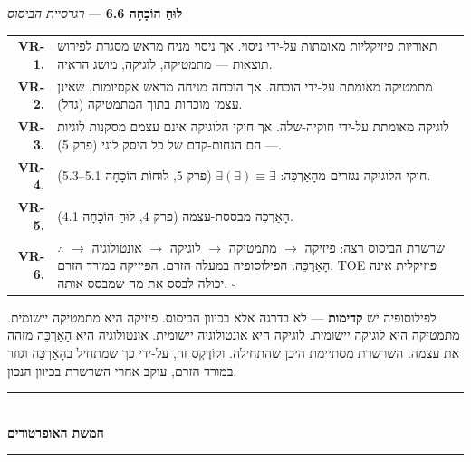 \documentclass[10pt, openany, oneside]{book}
\renewcommand{\normalsize}{\fontsize{10}{13}\selectfont}
\renewcommand{\footnotesize}{\fontsize{8.5}{11}\selectfont}
\begin{document}
\vspace{0.5em}

\textbf{לוּחַ הוֹכָחָה 6.6} --- \textit{רגרסיית הביסוס}

\vspace{0.5em}

{\footnotesize
\noindent\begin{tabular}{r p{}}
\textbf{VR-1.} & תאוריות פיזיקליות מאומתות על-ידי ניסוי. אך ניסוי מניח מראש מסגרת לפירוש תוצאות — מתמטיקה, לוגיקה, מושג הראיה. \\[0.3em]
\textbf{VR-2.} & מתמטיקה מאומתת על-ידי הוכחה. אך הוכחה מניחה מראש אקסיומות, שאינן עצמן מוכחות בתוך המתמטיקה (גדל). \\[0.3em]
\textbf{VR-3.} & לוגיקה מאומתת על-ידי חוקיה-שלה. אך חוקי הלוגיקה אינם עצמם מסקנות לוגיות — הם הנחות-קדם של כל היסק לוגי (פרק 5). \\[0.3em]
\textbf{VR-4.} & חוקי הלוגיקה נגזרים מהָאַרְכֵּה: $\exists(\exists) \equiv \exists$ (פרק 5, לוּחוֹת הוֹכָחָה 5.1–5.3). \\[0.3em]
\textbf{VR-5.} & הָאַרְכֵּה מבססת-עצמה (פרק 4, לוּחַ הוֹכָחָה 4.1). \\[0.3em]
\textbf{VR-6.} & $\therefore$ שרשרת הביסוס רצה: פיזיקה $\to$ מתמטיקה $\to$ לוגיקה $\to$ אונטולוגיה $\to$ הָאַרְכֵּה. הפילוסופיה במעלה הזרם. הפיזיקה במורד הזרם. TOE פיזיקלית אינה יכולה לבסס את מה שמבסס אותה. $\square$ \\[0.3em]
\end{tabular}
}

\vspace{0.8em}

\noindent לפילוסופיה יש \textbf{קדימות} — לא בדרגה אלא בכיוון הביסוס. פיזיקה היא מתמטיקה יישומית. מתמטיקה היא לוגיקה יישומית. לוגיקה היא אונטולוגיה יישומית. אונטולוגיה היא הָאַרְכֵּה מזהה את עצמה. השרשרת מסתיימת היכן שהתחילה. וקוֹדֶקְס זה, על-ידי כך שמתחיל בהָאַרְכֵּה וגוזר במורד הזרם, עוקב אחרי השרשרת בכיוון הנכון.

\vspace{1.5em}


\begin{center}
    \rule{0.3\textwidth}{0.4pt}\\[0.5em]
    {\normalsize\bfseries\textsc{חמשת האופרטורים}}\\[0.3em]
    \rule{0.3\textwidth}{0.4pt}
\end{center}
\end{document}
